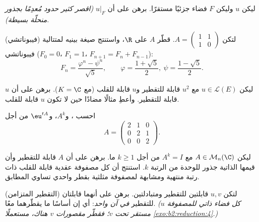 \begin{exercise}[$\star\star$]\label{exo:b2:reduction:4}
ليكن $u$  وليكن $F$ فضاء جزئيًا مستقرًا. برهن على أن
$u|_F$  \emph{(اقصر كثير حدود مُعدِمًا بجذور
منحلّة بسيطة)}.
\end{exercise}

\begin{exercise}[$\star\star$]\label{exo:b2:reduction:5}
(فيبوناتشي) لتكن $A = \begin{pmatrix} 1 & 1\\ 1 & 0\end{pmatrix}$.
قطّر $A$ على $\R$، واستنتج صيغة بينيه لمتتالية
فيبوناتشي ($F_0 = 0$، $F_1 = 1$، $F_{n+1} = F_n +
F_{n-1}$):
\[
F_n = \frac{\varphi^n - \psi^n}{\sqrt 5},
\qquad \varphi = \frac{1 + \sqrt5}{2},\ \psi = \frac{1 -
\sqrt5}{2}.
\]
\end{exercise}

\begin{exercise}[$\star\star$]\label{exo:b2:reduction:6}
ليكن $u \in \mathcal{L}(E)$ مع $u^2$ قابلة للتقطير و$u$
قابلة للقلب (مع $K = \C$). برهن على أن $u$ قابلة للتقطير. وأعطِ
مثالًا مضادًا حين لا تكون $u$ قابلة للقلب.
\end{exercise}

\begin{exercise}[$\star\star$]\label{exo:b2:reduction:7}
احسب ، و$A^k$، و$\eu^{tA}$ من أجل
\[
A = \begin{pmatrix} 2 & 1 & 0\\ 0 & 2 & 1\\ 0 & 0 & 2
\end{pmatrix}.
\]
\end{exercise}

\begin{exercise}[$\star\star$]\label{exo:b2:reduction:8}
ليكن $A \in \mathcal{M}_n(\C)$ مع $A^k = I$ من أجل $k \geq 1$ ما.
برهن على أن $A$ قابلة للتقطير وأن قيمها الذاتية جذور
للوحدة من الرتبة $k$. استنتج أن كل مصفوفة عقدية قابلة للقلب ذات رتبة منتهية
ومشابهة لمصفوفة مثلثية بقطر واحدي تساوي المطابق.
\end{exercise}

\begin{exercise}[$\star\star\star$]\label{exo:b2:reduction:9}
(التقطير المتزامن) لتكن $u, v$ قابلتين للتقطير
ومتبادلتين. برهن على أنهما قابلتان للتقطير \emph{في آن
واحد}: أي إن أساسًا ما يقطّرهما معًا. \emph{(كل فضاء ذاتي
للمصفوفة $u$ مستقر تحت $v$؛ فقطّر مقصورات $v$ هناك،
مستعملًا \cref{exo:b2:reduction:4}.)}
\end{exercise}

